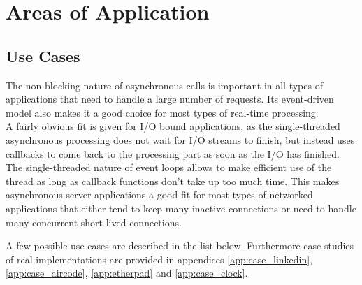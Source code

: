 \newpage
\section{Areas of Application}
\label{areas_of_application}

\subsection{Use Cases}
\label{use_cases}
The non-blocking nature of asynchronous calls is important in all types of
applications that need to handle a large number of requests. Its event-driven model
also makes it a good choice for most types of real-time processing.\\
A fairly obvious fit is given for I/O bound applications, as the single-threaded asynchronous processing
does not wait for I/O streams to finish, but instead uses callbacks to come back to the processing part
as soon as the I/O has finished.
The single-threaded nature of event loops allows to make efficient use of the
thread as long as callback functions don't take up too much time. This makes asynchronous
server applications a good fit for most types of networked applications that
either tend to keep many inactive connections or need to handle many concurrent 
short-lived connections.

A few possible use cases are described in the list below. Furthermore case studies of real
implementations are provided in appendices \ref{app:case_linkedin}, \ref{app:case_aircode},
\ref{app:etherpad} and \ref{app:case_clock}.

